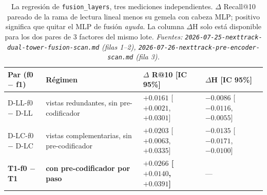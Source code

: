 \documentclass[11pt]{article}
\newcommand{\best}[1]{\textbf{#1}}
\begin{document}
\begin{table}[ht]
  \centering
  \caption{La regresión de \texttt{fusion\_layers}, tres mediciones
  independientes. $\Delta$ Recall@10 pareado de la rama de lectura lineal menos su
  gemela con cabeza MLP; positivo significa que quitar el MLP de fusión
  \emph{ayuda}. La columna $\Delta$H solo está disponible para los dos pares de 3
  factores del mismo lote. \emph{Fuentes:
  \texttt{2026-07-25-nexttrack-dual-tower-fusion-scan.md} (filas 1--2),
  \texttt{2026-07-26-nexttrack-pre-encoder-scan.md} (fila 3).}}
  \label{tab:nexttrack-fusion-depth}
  {\scriptsize\setlength{\tabcolsep}{4pt}\begin{tabular}{llll}
    \toprule
    Par (f0 $-$ f1) & Régimen & $\Delta$ R@10 [IC 95\%] & $\Delta$H [IC 95\%] \\
    \midrule
    D-LL-f0 $-$ D-LL & vistas redundantes, sin pre-codificador & $+0.0161$ [$+0.0021$, $+0.0301$] & $-0.0086$ [$-0.0116$, $-0.0055$] \\
    D-LC-f0 $-$ D-LC & vistas complementarias, sin pre-codificador & $+0.0203$ [$+0.0063$, $+0.0335$] & $-0.0135$ [$-0.0171$, $-0.0100$] \\
    \best{T1-f0 $-$ T1} & \best{con pre-codificador por paso} & \best{$+0.0266$ [$+0.0140$, $+0.0391$]} & --- \\
    \bottomrule
  \end{tabular}}
\end{table}
\end{document}
